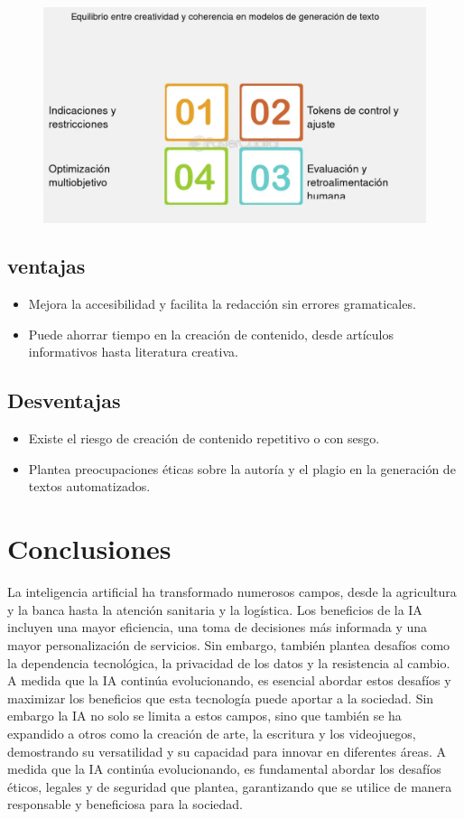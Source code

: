 \documentclass[12pt]{article}
\begin{document}
\begin{figure}[h!]
    \centering
    \includegraphics[width=.6\textwidth]{generacionCreativa.PNG}
    \label{fig:my_label}
\end{figure}

\subsection{ventajas}
\begin{itemize}
    \item Mejora la accesibilidad y facilita la redacción sin errores gramaticales.
    \item Puede ahorrar tiempo en la creación de contenido, desde artículos informativos hasta literatura creativa.
\end{itemize}

\subsection{Desventajas}
\begin{itemize}
    \item Existe el riesgo de creación de contenido repetitivo o con sesgo.
    \item Plantea preocupaciones éticas sobre la autoría y el plagio en la generación de textos automatizados.
\end{itemize}

\clearpage

\section{Conclusiones}

La inteligencia artificial ha transformado numerosos campos, desde la agricultura y la banca hasta la atención sanitaria y 
la logística. Los beneficios de la IA incluyen una mayor eficiencia, una toma de decisiones más informada y una mayor
personalización de servicios. Sin embargo, también plantea desafíos como la dependencia tecnológica, la privacidad de los datos
y la resistencia al cambio. A medida que la IA continúa evolucionando, es esencial abordar estos desafíos y maximizar los beneficios
que esta tecnología puede aportar a la sociedad.
Sin embargo la IA no solo se limita a estos campos, sino que también se ha expandido a otros como la creación de arte, la escritura
y los videojuegos, demostrando su versatilidad y su capacidad para innovar en diferentes áreas. A medida que la IA continúa evolucionando,
es fundamental abordar los desafíos éticos, legales y de seguridad que plantea, garantizando que se utilice de manera responsable y
beneficiosa para la sociedad.
\end{document}
